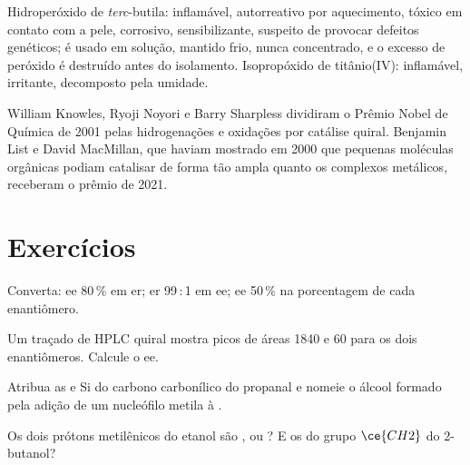 \begin{safety}{}
Hidroperóxido de \textit{terc}-butila: inflamável, autorreativo por aquecimento, tóxico em contato com
a pele, corrosivo, sensibilizante, suspeito de provocar defeitos genéticos; é usado
em solução, mantido frio, nunca concentrado, e o excesso de peróxido é destruído
antes do isolamento. Isopropóxido de titânio(IV): inflamável, irritante, decomposto pela
umidade.
\end{safety}

\begin{history}
William Knowles, Ryoji Noyori e Barry Sharpless dividiram o Prêmio Nobel de
Química de 2001 pelas hidrogenações e oxidações por catálise quiral. Benjamin List
e David MacMillan, que haviam mostrado em 2000 que pequenas moléculas orgânicas podiam
catalisar  de forma tão ampla quanto os complexos metálicos, receberam
o prêmio de 2021.
\end{history}

\section{Exercícios}

\begin{exercise}[$\star$]\label{exo:b3:asymmetric-synthesis:1}
Converta: ee 80\,\% em er; er 99\,:\,1 em ee; ee 50\,\% na porcentagem de cada
enantiômero.
\end{exercise}

\begin{exercise}[$\star$]\label{exo:b3:asymmetric-synthesis:2}
Um traçado de HPLC quiral mostra picos de áreas 1840 e 60 para os dois enantiômeros.
Calcule o ee.
\end{exercise}

\begin{exercise}[$\star$]\label{exo:b3:asymmetric-synthesis:3}
Atribua as  e Si do carbono carbonílico do propanal e nomeie o álcool
formado pela adição de um nucleófilo metila à .
\end{exercise}

\begin{exercise}[$\star$]\label{exo:b3:asymmetric-synthesis:4}
Os dois prótons metilênicos do etanol são ,  ou ?
E os do grupo $\ce{CH2}$ do 2-butanol?
\end{exercise}

